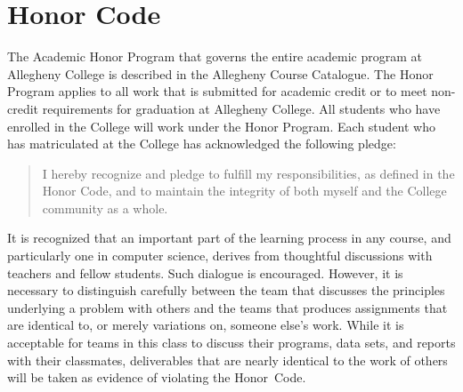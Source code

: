 \vspace*{-.15in}

\section*{Honor Code}

The Academic Honor Program that governs the entire academic program at Allegheny College is described in the Allegheny
Course Catalogue.  The Honor Program applies to all work that is submitted for academic credit or to meet non-credit
requirements for graduation at Allegheny College.  All students who have enrolled in the College will work under the
Honor Program.  Each student who has matriculated at the College has acknowledged the following pledge:

\vspace*{-.1in}
\begin{quote}
I hereby recognize and pledge to fulfill my responsibilities, as defined in the Honor Code, and to maintain the
integrity of both myself and the College community as a whole.
\end{quote}
\vspace*{-.1in}

\noindent It is recognized that an important part of the learning process in any course, and particularly one in
computer science, derives from thoughtful discussions with teachers and fellow students.  Such dialogue is encouraged.
However, it is necessary to distinguish carefully between the team that discusses the principles underlying a problem
with others and the teams that produces assignments that are identical to, or merely variations on, someone else's
work.  While it is acceptable for teams in this class to discuss their programs, data sets, and reports with their
classmates, deliverables that are nearly identical to the work of others will be taken as evidence of violating the
\mbox{Honor Code}.



